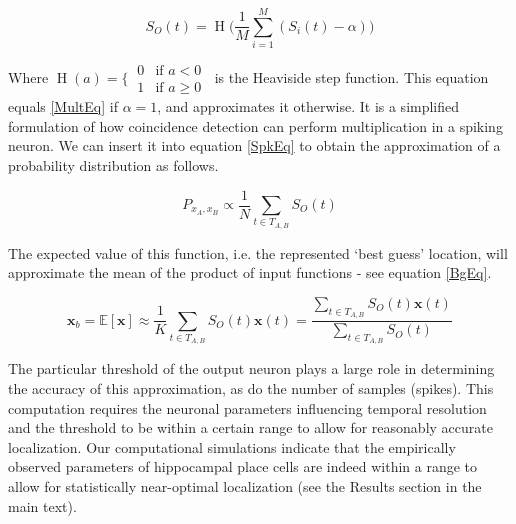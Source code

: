 \begin{equation}\label{ThrshMultEq}
S_{O}(t) = \operatorname{H}\Big(\frac{1}{M} \sum_{i=1}^M (S_{i}(t) - \alpha) \Big)
\end{equation} 

Where $ \operatorname{H}(a)=\Big\{ \: \begin{matrix} 0 & \text{if }a<0 \\ 1 & \text{if }a\ge 0 \end{matrix} \: $ is the Heaviside step function. This equation equals \eqref{MultEq} if $ \alpha=1 $, and approximates it otherwise. It is a simplified formulation of how coincidence detection can perform multiplication in a spiking neuron. We can insert it into equation \eqref{SpkEq} to obtain the approximation of a probability distribution as follows. 

\begin{equation}\label{CDPostEq}
P_{x_A,x_B} \propto \frac{1}{N} \sum_{t \in T_{A,B}}{S_O(t)}
\end{equation}  

The expected value of this function, i.e. the represented `best guess' location, will approximate the mean of the product of input functions - see equation \eqref{BgEq}.


\begin{equation}\label{CDBgEq}
\boldsymbol x_b = \mathbb{E}[\boldsymbol x] \approx \frac{1}{K} \sum_{t \in T_{A,B}}{S_{O}(t) \boldsymbol x(t)} = \frac{\sum_{t \in T_{A,B}}{S_{O}(t) \boldsymbol x(t)}}{\sum_{t \in T_{A,B}}{S_{O}(t)}} 
\end{equation}  

The particular threshold of the output neuron plays a large role in determining the accuracy of this approximation, as do the number of samples (spikes). This computation requires the neuronal parameters influencing temporal resolution and the threshold to be within a certain range to allow for reasonably accurate localization. Our computational simulations indicate that the empirically observed parameters of hippocampal place cells are indeed within a range to allow for statistically near-optimal localization (see the Results section in the main text).

